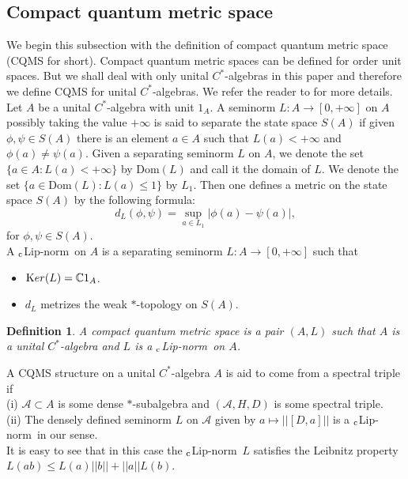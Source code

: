 \documentclass[a4paper,11pt,reqno]{amsart}
\theoremstyle{plain}
\newtheorem{defn}[thm]{Definition}
\theoremstyle{mainthmstyle}
\theoremstyle{named}
\numberwithin{equation}{section}
\newcommand{\clipnorm}{$_{\text{\rm c}}$Lip-norm}
\begin{document}
\subsection{Compact quantum metric space}
We begin this subsection with the definition of compact quantum metric space (CQMS for short). Compact quantum metric spaces can be defined for order unit spaces. But we shall deal with only unital $C^{\ast}$-algebras in this paper and therefore we define CQMS for unital $C^{\ast}$-algebras. We refer the reader to \cite{Rieffel1} for more details. Let $A$ be a unital $C^{\ast}$-algebra with unit $1_{A}$. A seminorm $L:A\rightarrow[0,+\infty]$ on $A$ possibly taking the value $+\infty$ is said to separate the state space $S(A)$ if given $\phi,\psi\in S(A)$ there is an element $a\in A$ such that $L(a)<+\infty$ and $\phi(a)\neq\psi(a)$. Given a separating seminorm $L$ on $A$, we denote the set $\{a\in A:L(a)<+\infty\}$ by $\mathrm{Dom}(L)$ and call it the domain of $L$. We denote the set $\{a\in\mathrm{Dom}(L):L(a)\leq 1\}$ by $L_1$. Then one defines a metric on the state space $S(A)$ by the following formula:
\begin{displaymath}
    d_{L}(\phi,\psi)=\sup\limits_{a\in L_{1}}\lvert\phi(a)-\psi(a)\rvert,
\end{displaymath}
for $\phi,\psi\in S(A)$. \\
A \clipnorm\ on $A$ is a separating seminorm $L:A\rightarrow[0,+\infty]$ such that
\begin{itemize}
    \item ${\textrm Ker}(L)=\mathbb{C}1_{A}$.
    \item $d_{L}$ metrizes the weak $\ast$-topology on $S(A)$.
\end{itemize}
\begin{defn}\label{CQMSdefn}
    A compact quantum metric space is a pair $(A,L)$ such that $A$ is a unital $C^{\ast}$-algebra and $L$ is a \clipnorm\ on $A$.
\end{defn}
A CQMS structure on a unital $C^{\ast}$-algebra $A$ is aid to come from a spectral triple if\\
(i) $\mathcal{A}\subset A$ is some dense $\ast$-subalgebra and $(\mathcal{A},H,D)$ is some spectral triple.\\
(ii) The densely defined seminorm $L$ on $\mathcal{A}$ given by $a\mapsto\lvert\lvert[D,a]\rvert\rvert$ is a \clipnorm\ in our sense.\\
It is easy to see that in this case the \clipnorm\ $L$ satisfies the Leibnitz property $L(ab)\leq L(a)\lvert\lvert b\rvert\rvert+\lvert\lvert a\rvert\rvert L(b)$.
\end{document}
